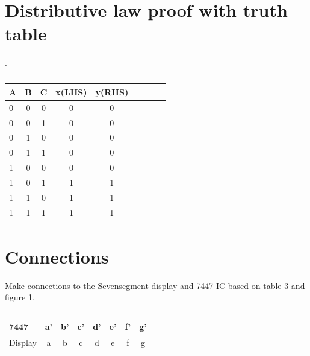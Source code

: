 \documentclass[10pt, a4paper]{article}
\begin{document}
\section{Distributive law proof with truth table}
.


\begin{table}[htbp]
 \begin{center}
    \begin{tabular}{|l|c|c|c|c|c|c|c|c} \hline \textbf{A}
  & \textbf{B} & \textbf{C} & \textbf{x(LHS)}& \textbf{y(RHS)} \\
 \hline
0&0&0&0&0 \\ \hline
0&0&1&0&0 \\ \hline
0&1&0&0&0\\ \hline
0&1&1&0&0  \\ \hline
1&0&0&0&0 \\ \hline
1&0&1&1&1\\ \hline
1&1&0&1&1\\ \hline
1&1&1&1&1\\ \hline
\end{tabular}   
\end{center}
\caption{\label{table:dummytable} }
\end{table}







\section{Connections}

Make connections to the Sevensegment display and 7447 IC based on table 3 and figure 1.
\begin{table}[htbp]
 \begin{center}
    \begin{tabular}{|l|c|c|c|c|c|c|c|c} \hline \textbf{7447}
  & \textbf{a'} & \textbf{b'} & \textbf{c'}& \textbf{d'}& \textbf{e'}& \textbf{f'}& \textbf{g'} \\
 \hline
Display&a&b&c&d&e&f&g \\ \hline

\end{tabular}   
\end{center}
\caption{\label{table:dummytable} }
\end{table}
\end{document}
